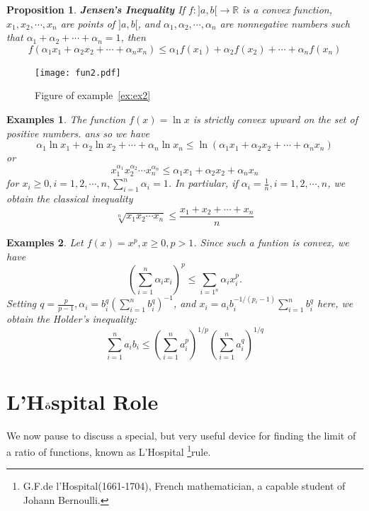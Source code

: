 \documentclass[a4paper,12pt]{article} %
\newtheorem{proposition}{Proposition}[section]
\newtheorem{example}{Examples}
\begin{document}
\begin{proposition}{\rm \textbf{Jensen's Inequality}}
    \normalfont
    If $f: ]a,b[ \to \mathbb{R}$ is a convex function, $x_1, x_2, \cdots, x_n$ are points 
    of $]a,b[$, and $\alpha_1, \alpha_2, \cdots, \alpha_n$ are nonnegative numbers such that 
    $\alpha_1 + \alpha_2 + \cdots + \alpha_n = 1$, then 
    \[
        f(\alpha_1x_1 + \alpha_2x_2 + \cdots + \alpha_nx_n) \le \alpha_1f(x_1) + \alpha_2f(x_2) + \cdots + \alpha_nf(x_n)
        \]
\end{proposition}
\graphicspath{
    {./fun2/}
}
\begin{figure}[htbp]
    \centering
    \texttt{[image: fun2.pdf]}
    \caption{Figure of example~\ref{ex:ex2}}
    \label{fig:fig3}
\end{figure}

\begin{example}
    \normalfont
    The function $f(x) = \ln x$ is strictly convex upward on the set of 
    positive numbers. ans so we have 
    \[
        \alpha_1\ln x_1 + \alpha_2\ln x_2 + \cdots + \alpha_n\ln x_n \le \ln\left(\alpha_1x_1 + \alpha_2x_2 
        + \cdots + \alpha_nx_n\right)
        \]
    or 
    \[
        x_1^{\alpha_1} x_2^{\alpha_2} \cdots x_n^{\alpha_n} \le \alpha_1x_1 + \alpha_2x_2 + \alpha_nx_n
        \]
    for $x_i \ge 0, i=1,2,\cdots,n, \sum_{i=1}^n\alpha_i = 1$.
    In partiular, if $\alpha_i = \frac{1}{n}, i=1,2,\cdots,n$, we obtain the classical 
    inequality 
    \[
        \sqrt[n]{x_1x_2\cdots x_n} \le \frac{x_1 + x_2 + \cdots + x_n}{n}
        \]
\end{example}

\begin{example}
    \normalfont
    Let $f(x) = x^p, x \ge 0, p>1$. Since such a funtion is convex, we have 
    \[
        \left(\sum_{i=1}^n\alpha_i x_i\right)^p \le \sum_{i=1^n}\alpha_ix_i^p.
        \]
    Setting $\displaystyle q = \frac{p}{p-1}, \alpha_i = b_i^q\left(\sum_{i=1}^nb_i^q\right)^{-1}$, and 
    $\displaystyle x_i = a_ib_i^{-1/(p_i-1)}\sum_{i=1}^nb_i^q$ here, we obtain the Holder's 
    inequality:
    \[
        \sum_{i=1}^na_ib_i \le \left(\sum_{i=1}^na_i^p\right)^{1/p}\left(\sum_{i=1}^na_i^q\right)^{1/q}
        \]
\end{example}

\section{L'H$\ddot{\rm \textbf{o}}$spital Role}
We now pause to discuss a special, but very useful device for finding 
the limit of a ratio of functions, known as L'Hospital 
\footnote{G.F.de l'Hospital(1661-1704), French mathematician, a capable 
student of Johann Bernoulli.}rule.
\end{document}
